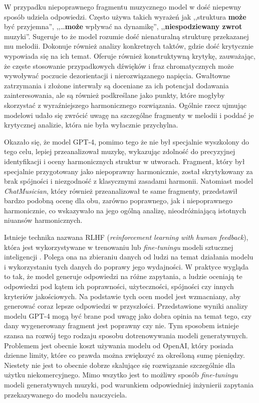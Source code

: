 \documentclass[data-science]{agh-wi} %
\begin{document}
W przypadku niepoprawnego fragmentu muzycznego model w dość niepewny sposób udziela odpowiedzi. Często używa takich wyrażeń jak ,,struktura \textbf{może} być przyjemna'', ,,\dots \textbf{może} wpływać na dynamikę'', ,,\textbf{niespodziewany zwrot} muzyki''. Sugeruje to że model rozumie dość nienaturalną strukturę przekazanej mu melodii. Dokonuje również analizy konkretnych taktów, gdzie dość krytycznie wypowiada się na ich temat. Oferuje również konstruktywną krytykę, zauważając, że częste stosowanie przypadkowych dźwięków i fraz chromatycznych może wywoływać poczucie dezorientacji i nierozwiązanego napięcia. Gwałtowne zatrzymania i złożone interwały są doceniane za ich potencjał dodawania zainteresowania, ale są również podkreślane jako punkty, które mogłyby skorzystać z wyraźniejszego harmonicznego rozwiązania. Ogólnie rzecz ujmując modelowi udało się zwrócić uwagę na szczególne fragmenty w melodii i poddać je krytycznej analizie, która nie była wyłacznie przychylna.

Okazało się, że model GPT-4, pomimo tego że nie był specjalnie wyszkolony do tego celu, lepiej przeanalizował muzykę, wykazując zdolność do precyzyjnej identyfikacji i oceny harmonicznych struktur w utworach. Fragment, który był specjalnie przygotowany jako niepoprawny harmonicznie, został skrytykowany za brak spójności i niezgodność z klasycznymi zasadami harmonii. Natomiast model \textit{ChatMusician}, który również przeanalizował te same fragmenty, przedstawił bardzo podobną ocenę dla obu, zarówno poprawnego, jak i niepoprawnego harmonicznie, co wskazywało na jego ogólną analizę, nieodróżniającą istotnych niuansów harmonicznych.

Istnieje technika nazwana RLHF (\textit{reinforcement learning with human feedback}), która jest wykorzystywane w trenowaniu lub \textit{fine-tuningu} modeli sztucznej inteligencji \cite{rl_training}. Polega ona na zbieraniu danych od ludzi na temat działania modelu i wykorzystaniu tych danych do poprawy jego wydajności. W praktyce wygląda to tak, że model generuje odpowiedzi na różne zapytania, a ludzie oceniają te odpowiedzi pod kątem ich poprawności, użyteczności, spójności czy innych kryteriów jakościowych. Na podstawie tych ocen model jest wzmacniany, aby generować coraz lepsze odpowiedzi w przyszłości. Przedstawione wyniki analizy modelu GPT-4 mogą być brane pod uwagę jako dobra opinia na temat tego, czy dany wygenerowany fragment jest poprawny czy nie. Tym sposobem istnieje szansa na rozwój tego rodzaju sposobu dotrenowywania modeli generatywnych. Problemem jest obecnie koszt używania modelu od OpenAI, który posiada dzienne limity, które co prawda można zwiększyć za określoną sumę pieniędzy. Niestety nie jest to obecnie dobrze skalujące się rozwiązanie szczególnie dla użytku niekomercyjnego. Mimo wszytko jest to możliwy sposób \textit{fine-tuningu} modeli generatywnych muzyki, pod warunkiem odpowiedniej inżynierii zapytania przekazywanego do modelu nauczyciela.
\end{document}
